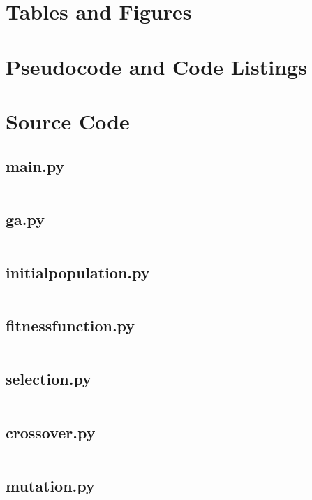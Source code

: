 \documentclass[a4paper, 12pt]{report}
\begin{document}
\chapter{Tables and Figures} %

\chapter{Pseudocode and Code Listings} %

\listoffigures

\chapter{Source Code}

\section{main.py}
\inputminted[linenos, fontsize=\footnotesize]{Python}{../main.py}

\section{ga.py}
\inputminted[linenos, fontsize=\footnotesize]{Python}{../modules/ga.py}

\section{initial{\textunderscore}population.py}
\inputminted[linenos, fontsize=\footnotesize]{Python}{
	../modules/initial_population.py}

\section{fitness{\textunderscore}function.py}
\inputminted[linenos, fontsize=\footnotesize]{Python}{
	../modules/fitness_function.py}

\section{selection.py}
\inputminted[linenos, fontsize=\footnotesize]{Python}{../modules/selection.py}

\section{crossover.py}
\inputminted[linenos, fontsize=\footnotesize]{Python}{../modules/crossover.py}

\section{mutation.py}
\inputminted[linenos, fontsize=\footnotesize]{Python}{../modules/mutation.py}
\end{document}
